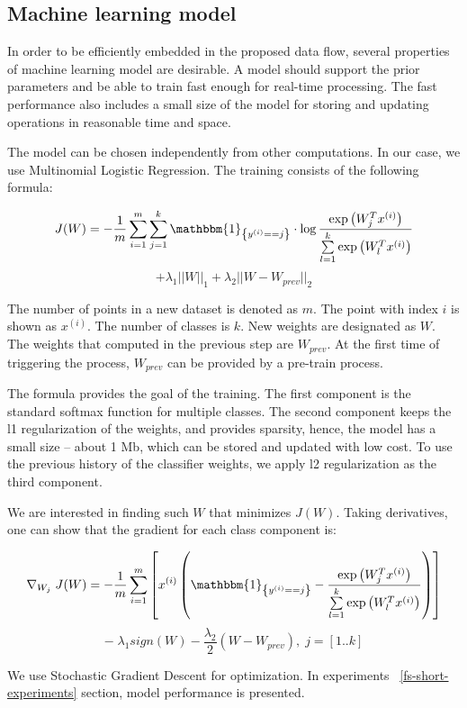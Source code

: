 \subsection{Machine learning model \label{ML}}

In order to be efficiently embedded in the proposed data flow, several properties of machine learning model are desirable. A model should support the prior parameters and be able to train fast enough for real-time processing. The fast performance also includes a small size of the model for storing and updating operations in reasonable time and space.

The model can be chosen independently from other computations. In our case, we use Multinomial Logistic Regression. The training consists of the following formula:

\begin{center}

$$ J(W) = -\frac{1}{m} \sum \limits_{i = 1}^{m} \sum \limits_{j = 1}^{k} \mathbbm{1}_{\left\{y^{(i)} == j\right\}} \cdot \log \frac{\exp\left({W_{j}^Tx^{(i)}}\right) }{\sum \limits_{l = 1}^{k}  \exp\left({W_{l}^Tx^{(i)}}\right) }$$ 
 $$ +  \lambda_1 ||W||_1 + \lambda_2 ||W - W_{prev}||_2 $$

\end{center} 

The number of points in a new dataset is denoted as $m$. The point with index $i$ is shown as $x^{(i)}$. The number of classes is $k$. New weights are designated as $W$. The weights that computed in the previous step are $W_{prev}$. At the first time of triggering the process, $W_{prev}$ can be provided by a pre-train process.  

The formula provides the goal of the training. The first component is the standard softmax function for multiple classes. The second component keeps the l1 regularization of the weights, and provides sparsity, hence, the model has a small size -- about 1 Mb, which can be stored and updated with low cost. To use the previous history of the classifier weights, we apply l2 regularization as the third component. 

We are interested in finding such $W$ that minimizes $J(W)$. Taking derivatives, one can show that the gradient for each class component is:

\begin{center}

$$ \nabla_{W_j} \; J(W) = -\frac{1}{m} \sum \limits_{i = 1}^{m} \left[ x^{(i)} \left( \mathbbm{1}_{\left\{y^{(i)} == j\right\} } - \frac{\exp\left({W_{j}^Tx^{(i)}}\right)}{\sum \limits_{l = 1}^{k}  \exp\left({W_{l}^Tx^{(i)}}\right)} \right) \right] $$
$$ - \; \lambda_1 sign\left(W\right) - \frac{\lambda_2}{2} \left(W - W_{prev} \right), \; j = [1..k] $$

\end{center} 

We use Stochastic Gradient Descent for optimization. In experiments ~\ref{fs-short-experiments} section, model performance is presented.